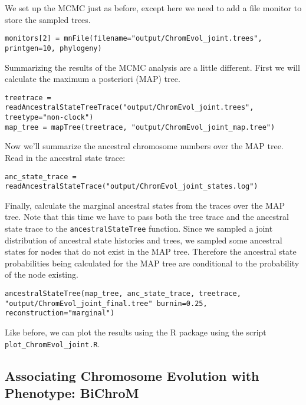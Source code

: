 We set up the MCMC just as before, except here we
need to add a file monitor to store the sampled trees.
{\tt \begin{snugshade*}
\begin{lstlisting}
monitors[2] = mnFile(filename="output/ChromEvol_joint.trees", printgen=10, phylogeny)
\end{lstlisting}
\end{snugshade*}}
Summarizing the results of the MCMC analysis are a little different.
First we will calculate the maximum a posteriori (MAP) tree.
{\tt \begin{snugshade*}
\begin{lstlisting}
treetrace = readAncestralStateTreeTrace("output/ChromEvol_joint.trees", treetype="non-clock")
map_tree = mapTree(treetrace, "output/ChromEvol_joint_map.tree")
\end{lstlisting}
\end{snugshade*}}
Now we'll summarize the ancestral chromosome numbers over the MAP tree.
Read in the ancestral state trace:
{\tt \begin{snugshade*}
\begin{lstlisting}
anc_state_trace = readAncestralStateTrace("output/ChromEvol_joint_states.log")
\end{lstlisting}
\end{snugshade*}}
Finally, calculate the marginal ancestral states from the traces over the MAP tree.
Note that this time we have to pass both the tree trace and the ancestral state
trace to the \texttt{ancestralStateTree} function.
Since we sampled a joint distribution of ancestral state histories and trees,
we sampled some ancestral states for nodes that do not exist in the MAP tree.
Therefore the ancestral state probabilities being calculated for the MAP tree
are conditional to the probability of the node existing.
{\tt \begin{snugshade*}
\begin{lstlisting}
ancestralStateTree(map_tree, anc_state_trace, treetrace, "output/ChromEvol_joint_final.tree" burnin=0.25, reconstruction="marginal")
\end{lstlisting}
\end{snugshade*}}
Like before, we can plot the results using the \RevGadgets R package using the script \texttt{plot\_ChromEvol\_joint.R}.

\bigskip

\subsection{Associating Chromosome Evolution with Phenotype: BiChroM}\label{subsect:bichrom}

